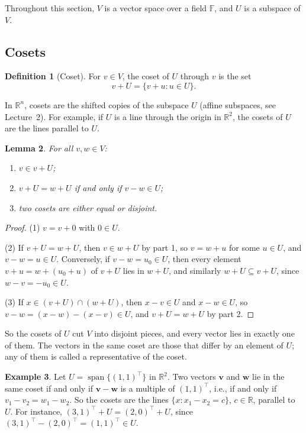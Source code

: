 \documentclass[11pt]{article}
\theoremstyle{definition}
\newtheorem{definition}{Definition}[section]
\newtheorem{example}[definition]{Example}
\theoremstyle{plain}
\newtheorem{lemma}[definition]{Lemma}
\theoremstyle{remark}
\DeclareMathOperator{\Span}{span}
\begin{document}
Throughout this section, $V$ is a vector space over a field $\mathbb{F}$, and $U$ is a subspace of $V$.

\subsection{Cosets}

\begin{definition}[Coset]
    For $v \in V$, the coset of $U$ through $v$ is the set
    \[v + U = \{v + u : u \in U\}.\]
\end{definition}

In $\mathbb{R}^n$, cosets are the shifted copies of the subspace $U$ (affine subspaces, see Lecture~2). For example, if $U$ is a line through the origin in $\mathbb{R}^2$, the cosets of $U$ are the lines parallel to $U$.

\begin{lemma}\label{lem:cosets}
    For all $v, w \in V$:
    \begin{enumerate}
        \item $v \in v + U$;
        \item $v + U = w + U$ if and only if $v - w \in U$;
        \item two cosets are either equal or disjoint.
    \end{enumerate}
\end{lemma}

\begin{proof}
    (1) $v = v + 0$ with $0 \in U$.

    (2) If $v + U = w + U$, then $v \in w + U$ by part 1, so $v = w + u$ for some $u \in U$, and $v - w = u \in U$. Conversely, if $v - w = u_0 \in U$, then every element $v + u = w + (u_0 + u)$ of $v + U$ lies in $w + U$, and similarly $w + U \subseteq v + U$, since $w - v = -u_0 \in U$.

    (3) If $x \in (v + U) \cap (w + U)$, then $x - v \in U$ and $x - w \in U$, so $v - w = (x - w) - (x - v) \in U$, and $v + U = w + U$ by part 2.
\end{proof}

So the cosets of $U$ cut $V$ into disjoint pieces, and every vector lies in exactly one of them. The vectors in the same coset are those that differ by an element of $U$; any of them is called a representative of the coset.

\begin{example}\label{ex:cosets-line}
    Let $U = \Span\{(1, 1)^\top\}$ in $\mathbb{R}^2$. Two vectors $\mathbf{v}$ and $\mathbf{w}$ lie in the same coset if and only if $\mathbf{v} - \mathbf{w}$ is a multiple of $(1, 1)^\top$, i.e., if and only if $v_1 - v_2 = w_1 - w_2$. So the cosets are the lines $\{x : x_1 - x_2 = c\}$, $c \in \mathbb{R}$, parallel to $U$. For instance, $(3, 1)^\top + U = (2, 0)^\top + U$, since $(3, 1)^\top - (2, 0)^\top = (1, 1)^\top \in U$.
\end{example}
\end{document}
